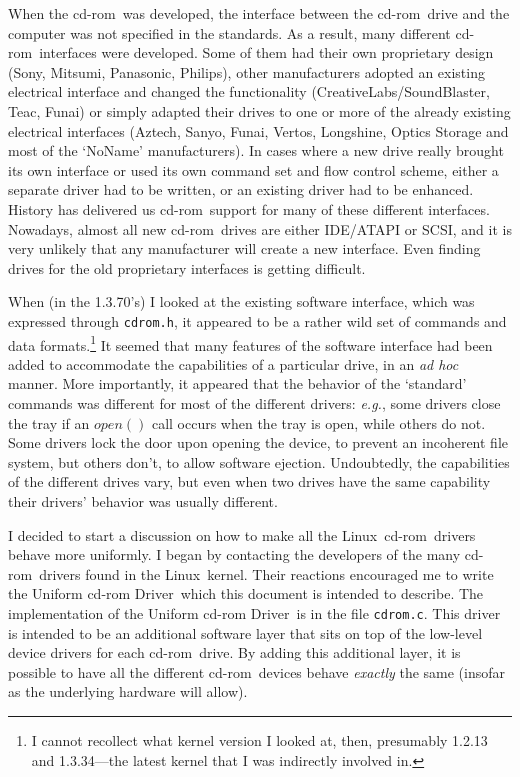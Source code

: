 \documentclass{article}
\def\linux{{\sc Linux}}
\def\cdrom{{\sc cd-rom}}
\def\UCD{{\sc Uniform cd-rom Driver}}
\def\cdromc{{\tt {cdrom.c}}}
\def\cdromh{{\tt {cdrom.h}}}
\def\fo{\sl}                    %
\def\eg{{\fo e.g.}}
\begin{document}
When the \cdrom\ was developed, the interface between the \cdrom\ drive
and the computer was not specified in the standards. As a result, many
different \cdrom\ interfaces were developed. Some of them had their
own proprietary design (Sony, Mitsumi, Panasonic, Philips), other
manufacturers adopted an existing electrical interface and changed
the functionality (CreativeLabs/SoundBlaster, Teac, Funai) or simply
adapted their drives to one or more of the already existing electrical
interfaces (Aztech, Sanyo, Funai, Vertos, Longshine, Optics Storage and
most of the `NoName' manufacturers). In cases where a new drive really
brought its own interface or used its own command set and flow control
scheme, either a separate driver had to be written, or an existing
driver had to be enhanced. History has delivered us \cdrom\ support for
many of these different interfaces. Nowadays, almost all new \cdrom\
drives are either IDE/ATAPI or SCSI, and it is very unlikely that any
manufacturer will create a new interface. Even finding drives for the
old proprietary interfaces is getting difficult.

When (in the 1.3.70's) I looked at the existing software interface,
which was expressed through \cdromh, it appeared to be a rather wild
set of commands and data formats.\footnote{I cannot recollect what
kernel version I looked at, then, presumably 1.2.13 and 1.3.34---the
latest kernel that I was indirectly involved in.} It seemed that many
features of the software interface had been added to accommodate the
capabilities of a particular drive, in an {\fo ad hoc\/} manner. More
importantly, it appeared that the behavior of the `standard' commands
was different for most of the different drivers: \eg, some drivers
close the tray if an $open()$ call occurs when the tray is open, while
others do not. Some drivers lock the door upon opening the device, to
prevent an incoherent file system, but others don't, to allow software
ejection. Undoubtedly, the capabilities of the different drives vary,
but even when two drives have the same capability their drivers'
behavior was usually different.

I decided to start a discussion on how to make all the \linux\ \cdrom\
drivers behave more uniformly. I began by contacting the developers of
the many \cdrom\ drivers found in the \linux\ kernel. Their reactions
encouraged me to write the \UCD\ which this document is intended to
describe. The implementation of the \UCD\ is in the file \cdromc. This
driver is intended to be an additional software layer that sits on top
of the low-level device drivers for each \cdrom\ drive. By adding this
additional layer, it is possible to have all the different \cdrom\
devices behave {\em exactly\/} the same (insofar as the underlying
hardware will allow).
\end{document}
